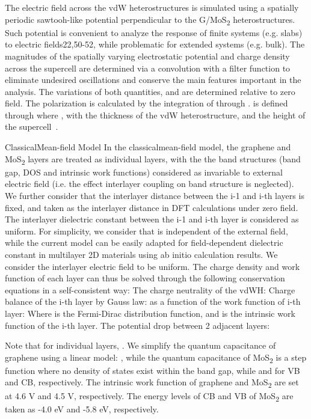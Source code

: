 The electric field   across the vdW heterostructures is simulated using a spatially periodic sawtooh-like potential   perpendicular to the G/MoS\textsubscript{2} heterostructures. Such potential is convenient to analyze the response of finite systems (e.g. slabs) to electric fields22,50-52, while problematic for extended systems (e.g. bulk).  The magnitudes of the spatially varying electrostatic potential and charge density   across the supercell are determined via a convolution with a filter function to eliminate undesired oscillations and conserve the main features important in the analysis. The variations of both quantities,  and  are determined relative to zero field. The polarization   is calculated by the integration of   through  .   is defined through   where   , with   the thickness of the vdW heterostructure, and    the height of the supercell~\cite{Santos_2013_ACSnano_kaxi,Santos_2013_tunable_eps_gr}.

ClassicalMean-field Model
In the classicalmean-field model, the graphene and MoS\textsubscript{2} layers are treated as individual layers, with the the band structures (band gap, DOS and intrinsic work functions) considered as invariable to external electric field (i.e. the effect interlayer coupling on band structure is neglected). We further consider that the interlayer distance  between the i-1 and i-th layers is fixed, and taken as the interlayer distance in DFT calculations under zero field. The interlayer dielectric constant  between the i-1 and i-th layer is considered as uniform. For simplicity, we consider that  is independent of the external field, while the current model can be easily adapted for field-dependent dielectric constant in multilayer 2D materials using ab initio calculation results. We consider the interlayer electric field   to be uniform. The charge density   and work function   of each layer can thus be solved through the following conservation equations in a self-consistent way:
	The charge neutrality of the vdWH:
	Charge balance of the i-th layer by Gauss law:
	 as a function of the work function  of i-th layer:
Where   is the Fermi-Dirac distribution function, and   is the intrinsic work function of the i-th layer. 
	The potential drop between 2 adjacent layers:

Note that for individual layers,   . We simplify the quantum capacitance of graphene using a linear model:  , while the quantum capacitance of MoS\textsubscript{2} is a step function where no density of states exist within the band gap, while  and   for VB and CB, respectively. The intrinsic work function of graphene and MoS\textsubscript{2} are set at 4.6 V and 4.5 V, respectively. The energy levels of CB and VB of MoS\textsubscript{2} are taken as -4.0 eV and -5.8 eV, respectively.

